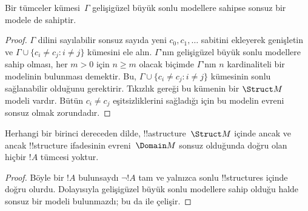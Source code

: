 \documentclass[../../../include/open-logic-section]{subfiles}
\begin{document}

\begin{thm}
 Bir tümceler kümesi~$\Gamma$ gelişigüzel büyük
sonlu modellere sahipse sonsuz bir modele de sahiptir.
\end{thm}

\begin{proof}
$\Gamma$ dilini sayılabilir sonsuz sayıda yeni $c_0,c_1,\dots$
sabitini ekleyerek genişletin ve
$\Gamma\cup\{c_i\neq c_j:i\neq j\}$ kümesini ele alın. $\Gamma$'nın
gelişigüzel büyük sonlu modellere sahip olması, her $m>0$ için
$n\geq m$ olacak biçimde $\Gamma$'nın $n$ kardinaliteli bir modelinin
bulunması demektir. Bu, $\Gamma\cup\{c_i\neq c_j:i\neq j\}$ kümesinin
sonlu sağlanabilir olduğunu gerektirir. Tıkızlık gereği bu kümenin bir
$\Struct M$ modeli vardır. Bütün $c_i\neq c_j$ eşitsizliklerini
sağladığı için bu modelin evreni sonsuz olmak zorundadır.
\end{proof}

\begin{prop}
Herhangi bir birinci dereceden dilde, !!a{structure}~$\Struct M$
içinde ancak ve ancak !!{structure} ifadesinin evreni~$\Domain M$
sonsuz olduğunda doğru olan hiçbir $!A$ tümcesi yoktur.
\end{prop}

\begin{proof}
Böyle bir $!A$ bulunsaydı $\lnot !A$ tam ve yalnızca sonlu
!!{structure}s içinde doğru olurdu. Dolayısıyla gelişigüzel büyük sonlu
modellere sahip olduğu halde sonsuz bir modeli bulunmazdı; bu da
 ile çelişir.
\end{proof}
\end{document}
